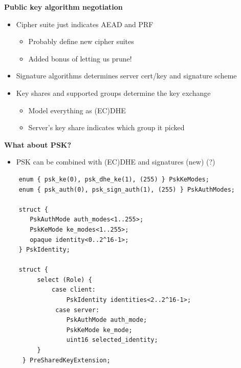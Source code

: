 \documentclass[helvetica]{seminar}
\newcommand{\heading}[1]{%
  \begin{center} 
    \large\bf 
    #1 
  \end{center} 
  \vspace{.4 in}}
\begin{document}
\begin{slide}
\heading{Public key algorithm negotiation}

\begin{itemize}
\item Cipher suite just indicates AEAD and PRF
  \begin{itemize}
  \item Probably define new cipher suites
  \item Added bonus of letting us prune!
  \end{itemize}

\item Signature algorithms determines server cert/key and signature scheme
\item Key shares and supported groups determine the key exchange
  \begin{itemize}
  \item Model everything as (EC)DHE
  \item Server's key share indicates which group it picked
  \end{itemize}
\end{itemize}
\end{slide}

\begin{slide}
\heading{What about PSK?}

\vspace{-5ex}
\begin{itemize}
\item PSK can be combined with (EC)DHE and signatures (new) (?)
\end{itemize}

\vspace{-1ex}
\begin{scriptsize}
\begin{verbatim}
    enum { psk_ke(0), psk_dhe_ke(1), (255) } PskKeModes;
    enum { psk_auth(0), psk_sign_auth(1), (255) } PskAuthModes;

    struct {
       PskAuthMode auth_modes<1..255>;
       PskKeMode ke_modes<1..255>;
       opaque identity<0..2^16-1>; 
    } PskIdentity;

    struct {
         select (Role) {
             case client:
                 PskIdentity identities<2..2^16-1>;
              case server:
                 PskAuthMode auth_mode;
                 PskKeMode ke_mode;
                 uint16 selected_identity;
         }
     } PreSharedKeyExtension;
\end{verbatim}
\end{scriptsize}
\end{slide}
\end{document}
